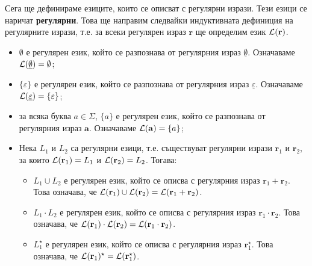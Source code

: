 Сега ще дефинираме езиците, които се описват с регулярни изрази.
Тези езици се наричат {\bf регулярни}.
Това ще направим следвайки индуктивната дефиниция на регулярните изрази,
т.е. за всеки регулярен израз $\mathbf{r}$ ще определим език $\mathcal{L}(\mathbf{r})$.
\begin{itemize}
\item
  $\emptyset$ е регулярен език,
  който се разпознава от регулярния израз $\underline{\emptyset}$. Означаваме $\mathcal{L}(\underline{\emptyset}) = \emptyset$;
\item
  $\{\varepsilon\}$ е регулярен език,
  който се разпознава от регулярния израз $\underline{\varepsilon}$.
  Означаваме $\mathcal{L}(\underline{\varepsilon}) = \{\varepsilon\}$;
\item
  за всяка буква $a \in \Sigma$, $\{a\}$ е регулярен език,
  който се разпознава от регулярния израз $\mathbf{a}$.
  Означаваме $\mathcal{L}(\mathbf{a}) = \{a\}$;
\item
  Нека $L_1$ и $L_2$ са регулярни езици, т.е. съществуват регулярни изрази $\mathbf{r}_1$
  и $\mathbf{r}_2$, за които $\mathcal{L}(\mathbf{r}_1) = L_1$ и $\mathcal{L}(\mathbf{r}_2) = L_2$.
  Тогава:
  \begin{itemize}
  \item 
    $L_1 \cup L_2$ е регулярен език, който се описва с регулярния израз $\mathbf{r}_1 + \mathbf{r}_2$.
    Това означава, че $\mathcal{L}(\mathbf{r}_1) \cup \mathcal{L}(\mathbf{r}_2) = \mathcal{L}(\mathbf{r}_1 + \mathbf{r}_2)$.
  \item
    $L_1 \cdot L_2$ е регулярен език, който се описва с регулярния израз $\mathbf{r}_1 \cdot \mathbf{r}_2$.
    Това означава, че $\mathcal{L}(\mathbf{r}_1) \cdot \mathcal{L}(\mathbf{r}_2) = \mathcal{L}(\mathbf{r}_1 \cdot \mathbf{r}_2)$.
  \item
    $L^\star_1$ е регулярен език, който се описва с регулярния израз $\mathbf{r}^\star_1$.
    Това означава, че $\mathcal{L}(\mathbf{r}_1)^\star = \mathcal{L}(\mathbf{r}^\star_1)$.
  \end{itemize}
\end{itemize}

